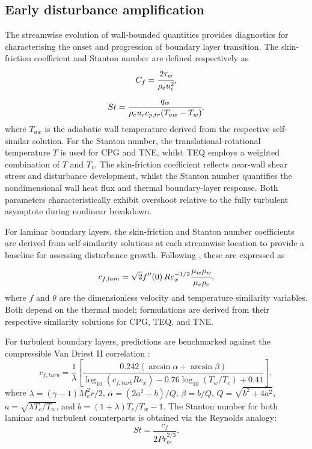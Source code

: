 \subsection{Early disturbance amplification}
The streamwise evolution of wall-bounded quantities provides diagnostics for characterising the onset and progression of boundary layer transition. The skin-friction coefficient and Stanton number are defined respectively as
\begin{equation}
    C_f = \cfrac{2\tau_w}{\rho_e u_e^2},
\end{equation}
\begin{equation}
    St = \cfrac{q_w}{\rho_e u_e c_{p,tr} (T_{aw}-T_w)},
\end{equation}
where $T_{aw}$ is the adiabatic wall temperature derived from the respective self-similar solution. For the Stanton number, the translational-rotational temperature $T$ is used for \gls{CPG} and \gls{TNE}, whilst \gls{TEQ} employs a weighted combination of $T$ and $T_v$. The skin-friction coefficient reflects near-wall shear stress and disturbance development, whilst the Stanton number quantifies the nondimensional wall heat flux and thermal boundary-layer response. Both parameters characteristically exhibit overshoot relative to the fully turbulent asymptote during nonlinear breakdown.

For laminar boundary layers, the skin-friction and Stanton number coefficients are derived from self-similarity solutions at each streamwise location to provide a baseline for assessing disturbance growth. Following \citet{White2005}, these are expressed as
\begin{equation}
c_{f,lam} = \sqrt{2} f''(0) \,Re_x^{-1/2}\cfrac{\mu_w \rho_w}{\mu_e \rho_e},
\end{equation}
where $f$ and $\theta$ are the dimensionless velocity and temperature similarity variables. Both depend on the thermal model; formulations are derived from their respective similarity solutions for \gls{CPG}, \gls{TEQ}, and \gls{TNE}.

For turbulent boundary layers, predictions are benchmarked against the compressible Van Driest II correlation \citep{VanDriest1952,Sandhametal2014}:
\begin{equation}
    c_{f,turb} = \frac{1}{\lambda} \left[ \frac{0.242 \left( \arcsin\alpha + \arcsin\beta \right)}{\log_{10}(c_{f,turb}  Re_x) - 0.76 \log_{10}(T_w/T_e) + 0.41} \right],
\end{equation}
where $\lambda = (\gamma - 1) M_e^2 r/2$, $\alpha = (2a^2 - b)/Q$, $\beta = b/Q$, $Q = \sqrt{b^2 + 4a^2}$, $a = \sqrt{\lambda T_e/T_w}$, and $b = (1+\lambda)T_e/T_w - 1$. The Stanton number for both laminar and turbulent counterparts is obtained via the Reynolds analogy:
\begin{equation}
St = \frac{c_f}{2Pr_{tr}^{2/3}}.
\end{equation}


